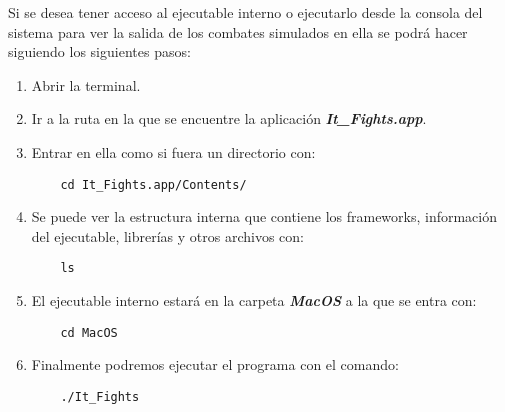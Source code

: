\bigskip

Si se desea tener acceso al ejecutable interno o ejecutarlo desde la consola del sistema para ver la salida de los combates simulados en ella se podrá hacer siguiendo los siguientes pasos:

\begin{enumerate}
	\item Abrir la terminal.
	\item Ir a la ruta en la que se encuentre la aplicación \textbf{\textit{It\_Fights.app}}.
	\item Entrar en ella como si fuera un directorio con:
		\begin{lstlisting}
	cd It_Fights.app/Contents/
		\end{lstlisting}
	\item Se puede ver la estructura interna que contiene los frameworks, información del ejecutable, librerías y otros archivos con:
		\begin{lstlisting}
	ls
		\end{lstlisting}
	\item El ejecutable interno estará en la carpeta \textbf{\textit{MacOS}} a la que se entra con:
		\begin{lstlisting}
	cd MacOS
		\end{lstlisting}
	\item Finalmente podremos ejecutar el programa con el comando:
		\begin{lstlisting}
	./It_Fights  
		\end{lstlisting}
\end{enumerate}

